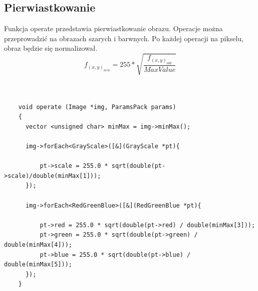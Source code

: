\documentclass{article}
\begin{document}
\subsection{Pierwiastkowanie}
Funkcja operate przedstawia pierwiastkowanie obrazu. Operacje można przeprowadzić na obrazach szarych i barwnych. Po każdej operacji na pikselu, obraz będzie się normalizował.
\begin{equation*}
f_(x,y)_{new} = 255*\sqrt{\frac{f_(x,y)_{old}}{MaxValue}}
\end{equation*}\\
\begin{Verbatim}[frame=single,label=Pierwiastkowanie (Source Code)]

    void operate (Image *img, ParamsPack params)
    {
      vector <unsigned char> minMax = img->minMax();

      img->forEach<GrayScale>([&](GrayScale *pt){
      
          pt->scale = 255.0 * sqrt(double(pt->scale)/double(minMax[1]));
      });

      img->forEach<RedGreenBlue>([&](RedGreenBlue *pt){
      
          pt->red = 255.0 * sqrt(double(pt->red) / double(minMax[3]));
          pt->green = 255.0 * sqrt(double(pt->green) / double(minMax[4]));
          pt->blue = 255.0 * sqrt(double(pt->blue) / double(minMax[5]));
      });
    }
    
\end{Verbatim}
\end{document}
